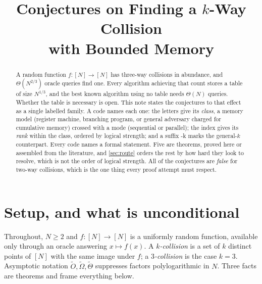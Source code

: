 \documentclass[11pt]{article}
\title{Conjectures on Finding a $k$-Way Collision\\ with Bounded Memory}
\author{}
\date{}
\theoremstyle{plain}
\theoremstyle{definition}
\newcommand{\NN}{[N]}
\begin{document}
\maketitle
\vspace{-4em}

\begin{abstract}
\noindent
A random function $f\colon \NN \to \NN$ has three-way collisions in
abundance, and $\Theta(N^{2/3})$ oracle queries find one.  Every algorithm
achieving that count stores a table of size $N^{1/3}$, and the best known
algorithm using no table needs $\Theta(N)$ queries.  Whether the table is
necessary is open.  This note states the conjectures to that effect as a
single labelled family.  A code names each one: the letters give its
\emph{class}, a memory model (register machine, branching program, or
general adversary charged for cumulative memory) crossed with a mode
(sequential or parallel); the index gives its \emph{rank} within the
class, ordered by logical strength; and a suffix \textsf{-k} marks the
general-$k$ counterpart.  Every code names a formal statement.  Five are
theorems, proved here or assembled from the literature, and
\cref{sec:route} orders the rest by how hard they look to resolve, which is
not the order of logical strength.  All of the conjectures are \emph{false}
for two-way collisions, which is the one thing every proof attempt must
respect.
\end{abstract}

\section{Setup, and what is unconditional}

Throughout, $N \geq 2$ and $f \colon \NN \to \NN$ is a uniformly random
function, available only through an oracle answering $x \mapsto f(x)$.  A
\emph{$k$-collision} is a set of $k$ distinct points of $\NN$ with the same
image under $f$; a \emph{$3$-collision} is the case $k=3$.  Asymptotic
notation $\tilde O, \tilde\Omega, \tilde\Theta$ suppresses factors
polylogarithmic in $N$.  Three facts are theorems and frame everything
below.
\end{document}
